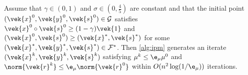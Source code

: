 \begin{theorem}\label{thm:ipm-convergence}
  Assume that \(\gamma \in (0, 1)\) and \(\sigma \in (0, \frac{4}{5})\) are constant and that the initial point \((\vek{x}^0, \vek{y}^0, \vek{s}^0) \in \mathcal{G}\) satisfies \(\vek{x}^0 \circ \vek{s}^0 \geq (1-\gamma)\vek{1}\) and \((\vek{x}^0, \vek{s}^0) \geq (\vek{x}^*, \vek{s}^*)\) for some \((\vek{x}^*, \vek{y}^*, \vek{s}^*) \in \mathcal{F}^*\).
  Then \cref{alg:ipm} generates an iterate \((\vek{x}^k, \vek{y}^k, \vek{s}^k)\) satisfying \(\mu^k \leq \e_\mu \mu^0\) and \(\norm{\vek{r}^k} \leq \e_\mu \norm{\vek{r}^0}\) within \(O(n^2 \log(1/\e_\mu))\) iterations.
\end{theorem}
